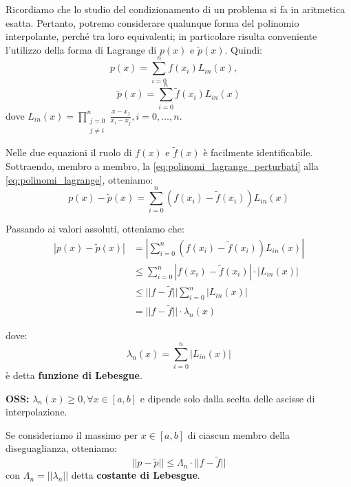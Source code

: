     Ricordiamo che lo studio del condizionamento di un problema si fa in aritmetica esatta. Pertanto, potremo considerare qualunque forma del polinomio interpolante, perché tra loro equivalenti; in particolare risulta conveniente l'utilizzo della forma di Lagrange di $p(x)$ e $\tilde{p}(x)$. Quindi:
    \begin{equation} \label{eq:polinomi_lagrange}
    p(x) = \sum_{i=0}^{n} f(x_i) L_{in}(x), \quad 
    \end{equation}
    \begin{equation} \label{eq:polinomi_lagrange_perturbati}
        \tilde{p}(x) = \sum_{i=0}^{n} \tilde{f}(x_i) L_{in}(x)
    \end{equation}
    dove $L_{in}(x) = \prod_{\substack{j=0 \\ j \neq i}}^{n} \frac{x - x_j}{x_i - x_j}, i=0, \dots, n$.
    
    Nelle due equazioni il ruolo di $f(x)$ e $\tilde{f}(x)$ è facilmente identificabile. Sottraendo, membro a membro, la \eqref{eq:polinomi_lagrange_perturbati} alla \eqref{eq:polinomi_lagrange}, otteniamo:
    $$p(x) - \tilde{p}(x) = \sum_{i=0}^{n} (f(x_i) - \tilde{f}(x_i)) L_{in}(x)$$
    
    Passando ai valori assoluti, otteniamo che:
    \begin{align*}
    |p(x) - \tilde{p}(x)| &= \left| \sum_{i=0}^{n} (f(x_i) - \tilde{f}(x_i)) L_{in}(x) \right| \\
    &\le \sum_{i=0}^{n} |f(x_i) - \tilde{f}(x_i)| \cdot |L_{in}(x)| \\
    &\le ||f - \tilde{f}|| \sum_{i=0}^{n} |L_{in}(x)| \\
    &= ||f - \tilde{f}|| \cdot \lambda_n(x)
    \end{align*}
    
    dove:
    \begin{equation} \label{eq:funz_lebesgue}
    \lambda_n(x) = \sum_{i=0}^{n} |L_{in}(x)|
    \end{equation}
    è detta \textbf{funzione di Lebesgue}.
    \vspace{0.5cm}
    
    \textbf{OSS:} $\lambda_n(x) \ge 0, \forall x \in [a,b]$ e dipende solo dalla scelta delle ascisse di interpolazione.
    
    \vspace{0.5cm}
    Se consideriamo il massimo per $x \in [a,b]$ di ciascun membro della diseguaglianza, otteniamo:
    \begin{equation} \label{eq:costante_lebesgue}
    ||p - \tilde{p}|| \le \Lambda_n \cdot ||f - \tilde{f}||
    \end{equation}
    con $\Lambda_n = ||\lambda_n||$ detta \textbf{costante di Lebesgue}.
    
